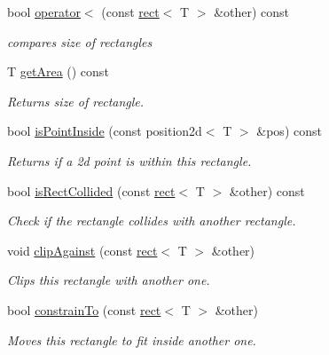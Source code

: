 \begin{DoxyCompactItemize}
bool \hyperlink{classirr_1_1core_1_1rect_a8af20faabcbf8880c1846a16e604c921}{operator$<$} (const \hyperlink{classirr_1_1core_1_1rect}{rect}$<$ T $>$ \&other) const
\begin{DoxyCompactList}\small\item\em compares size of rectangles \end{DoxyCompactList}\item 
\mbox{\label{classirr_1_1core_1_1rect_a1a9c505a1eb91ccb3e3915c61f9fb26d}} 
T \hyperlink{classirr_1_1core_1_1rect_a1a9c505a1eb91ccb3e3915c61f9fb26d}{get\+Area} () const
\begin{DoxyCompactList}\small\item\em Returns size of rectangle. \end{DoxyCompactList}\item 
bool \hyperlink{classirr_1_1core_1_1rect_a34c84ad8ff423a4b657eedbcd112afb3}{is\+Point\+Inside} (const position2d$<$ T $>$ \&pos) const
\begin{DoxyCompactList}\small\item\em Returns if a 2d point is within this rectangle. \end{DoxyCompactList}\item 
bool \hyperlink{classirr_1_1core_1_1rect_ab94b7d9da434c7b08761426e296c2f3e}{is\+Rect\+Collided} (const \hyperlink{classirr_1_1core_1_1rect}{rect}$<$ T $>$ \&other) const
\begin{DoxyCompactList}\small\item\em Check if the rectangle collides with another rectangle. \end{DoxyCompactList}\item 
void \hyperlink{classirr_1_1core_1_1rect_a86645d45a8bed1a3539bba9865e93de4}{clip\+Against} (const \hyperlink{classirr_1_1core_1_1rect}{rect}$<$ T $>$ \&other)
\begin{DoxyCompactList}\small\item\em Clips this rectangle with another one. \end{DoxyCompactList}\item 
bool \hyperlink{classirr_1_1core_1_1rect_a4515d2a1349dc805775854a422465f63}{constrain\+To} (const \hyperlink{classirr_1_1core_1_1rect}{rect}$<$ T $>$ \&other)
\begin{DoxyCompactList}\small\item\em Moves this rectangle to fit inside another one. \end{DoxyCompactList}\item 

\end{DoxyCompactItemize}
